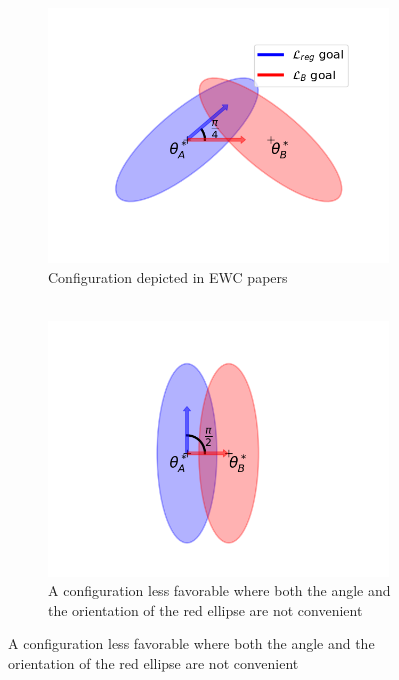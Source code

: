 \documentclass[11pt]{article}
\begin{document}
\begin{figure}
    \centering
    \begin{subfigure}[b]{0.3\textwidth}
        \centering
        \includegraphics[width=0.99\textwidth]{images/ellipse_overlap_45.png}
        \caption{Configuration depicted in EWC papers\\
         \\}
        \label{fig:two_ellipses_45}
    \end{subfigure}
    \hspace{-0mm}
    \begin{subfigure}[b]{0.3\textwidth}
        \centering
        \includegraphics[width=0.99\textwidth]{images/ellipse_overlap_90.png}
        \caption{A configuration less favorable where both the angle and the orientation of the red ellipse are not convenient}

\end{subfigure}
\end{figure}
\end{document}
